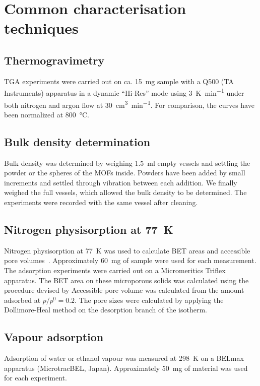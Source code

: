 
\graphicspath{ {\thisappx/figures/} }

\chapter{Common characterisation techniques}

\section{Thermogravimetry}\label{appx:char:TGA}

TGA experiments were carried out on ca. \SI{15}{\milli\gram} sample with a Q500 
(TA Instruments) apparatus in a dynamic “Hi-Res” mode using \SI{3}{\kelvin\per\minute}
under both nitrogen and argon flow at
\SI{30}{\cm\cubed\per\minute}. For comparison, the curves have been normalized at 
\SI{800}{\degreeCelsius}.

\section{Bulk density determination}

Bulk density was determined by weighing \SI{1.5}{\milli\litre} empty vessels and
settling the powder or the spheres of the MOFs inside. Powders have been added by small
increments and settled through vibration between each
addition. We finally weighed the full vessels, which allowed the bulk
density to be determined. The experiments were recorded with the
same vessel after cleaning.

\section{Nitrogen physisorption at \SI{77}{\kelvin}}

Nitrogen physisorption at \SI{77}{\kelvin} was used to calculate BET areas and accessible pore 
volumes~\cite{rouquerolAdsorptionPowdersPorous2013}. 
Approximately \SI{60}{\milli\gram} of sample were used for each measurement. 
The adsorption experiments were carried out on a Micromeritics Triflex apparatus.
The BET area on these microporous solids was calculated using the 
procedure devised by \citeauthor{rouquerolAdsorptionPowdersPorous2013} Accessible pore
volume was calculated from the amount adsorbed at \(p/p^0 = 0.2\). 
The pore sizes were calculated by applying the Dollimore-Heal method on the desorption
branch of the isotherm.

\section{Vapour adsorption}

Adsorption of water or ethanol vapour was measured at \SI{298}{\kelvin} on a BELmax apparatus
(MicrotracBEL, Japan). Approximately \SI{50}{\milli\gram} of material was used for each
experiment.
